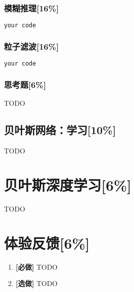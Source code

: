 \documentclass{article}
\begin{document}
\subsubsection{模糊推理[16\%]}

\begin{lstlisting}[language=Python]
your code
\end{lstlisting}




\subsubsection{粒子滤波[16\%]}

\begin{lstlisting}[language=Python]
your code
\end{lstlisting}



\subsubsection{思考题[6\%]}
TODO

\subsection{贝叶斯网络：学习[10\%]}
TODO

\section{贝叶斯深度学习[6\%]}

TODO




\section*{体验反馈[6\%]}

\begin{enumerate}[label=(\alph*), start=1]
    \item \textbf{[必做]} %
    TODO
    \item \textbf{[选做]} %
    TODO
\end{enumerate}
\end{document}
